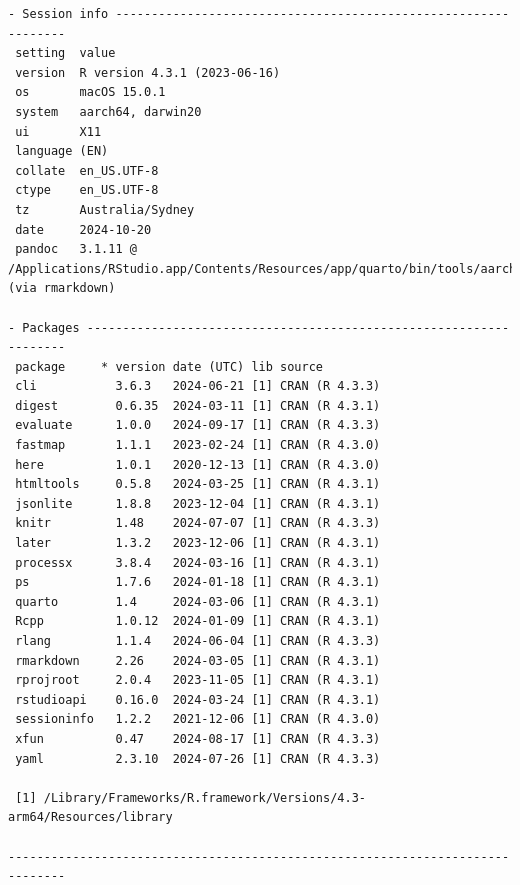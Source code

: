 \documentclass[
  a4paper,
  oneside,
  openany,
  12pt,
  onecolumn]{book}
\theoremstyle{definition}
\theoremstyle{plain}
\theoremstyle{remark}
\begin{document}
\begin{verbatim}
- Session info ---------------------------------------------------------------
 setting  value
 version  R version 4.3.1 (2023-06-16)
 os       macOS 15.0.1
 system   aarch64, darwin20
 ui       X11
 language (EN)
 collate  en_US.UTF-8
 ctype    en_US.UTF-8
 tz       Australia/Sydney
 date     2024-10-20
 pandoc   3.1.11 @ /Applications/RStudio.app/Contents/Resources/app/quarto/bin/tools/aarch64/ (via rmarkdown)

- Packages -------------------------------------------------------------------
 package     * version date (UTC) lib source
 cli           3.6.3   2024-06-21 [1] CRAN (R 4.3.3)
 digest        0.6.35  2024-03-11 [1] CRAN (R 4.3.1)
 evaluate      1.0.0   2024-09-17 [1] CRAN (R 4.3.3)
 fastmap       1.1.1   2023-02-24 [1] CRAN (R 4.3.0)
 here          1.0.1   2020-12-13 [1] CRAN (R 4.3.0)
 htmltools     0.5.8   2024-03-25 [1] CRAN (R 4.3.1)
 jsonlite      1.8.8   2023-12-04 [1] CRAN (R 4.3.1)
 knitr         1.48    2024-07-07 [1] CRAN (R 4.3.3)
 later         1.3.2   2023-12-06 [1] CRAN (R 4.3.1)
 processx      3.8.4   2024-03-16 [1] CRAN (R 4.3.1)
 ps            1.7.6   2024-01-18 [1] CRAN (R 4.3.1)
 quarto        1.4     2024-03-06 [1] CRAN (R 4.3.1)
 Rcpp          1.0.12  2024-01-09 [1] CRAN (R 4.3.1)
 rlang         1.1.4   2024-06-04 [1] CRAN (R 4.3.3)
 rmarkdown     2.26    2024-03-05 [1] CRAN (R 4.3.1)
 rprojroot     2.0.4   2023-11-05 [1] CRAN (R 4.3.1)
 rstudioapi    0.16.0  2024-03-24 [1] CRAN (R 4.3.1)
 sessioninfo   1.2.2   2021-12-06 [1] CRAN (R 4.3.0)
 xfun          0.47    2024-08-17 [1] CRAN (R 4.3.3)
 yaml          2.3.10  2024-07-26 [1] CRAN (R 4.3.3)

 [1] /Library/Frameworks/R.framework/Versions/4.3-arm64/Resources/library

------------------------------------------------------------------------------
\end{verbatim}


\backmatter
\end{document}

